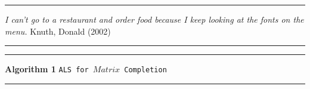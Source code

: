 \documentclass{article}
\begin{document}
\vskip100mm
\hrule\vspace{1ex}
\textit{I can't go to a restaurant and order food
    because I keep looking at the fonts on the menu.}
\hfill Knuth, Donald (2002)%
\vspace{1ex}
\hrule


\vskip100mm

\begin{center}
\rule{1.0\textwidth}{.6pt}
\vskip1mm
\end{center}

\textbf{Algorithm 1} \quad \texttt{ALS for $Matrix$ Completion}
\begin{center}
\rule{1.0\textwidth}{.4pt}
\end{center}
\end{document}
